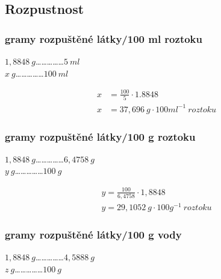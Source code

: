 \documentclass[13pt, a4paper, twoside]{article}
\begin{document}
\subsection*{Rozpustnost}
\subsubsection*{gramy rozpuštěné látky/100 ml roztoku}
\begin{center}
$1,8848 \:g$……………$5 \: ml$\\
$x\: g$……………$100 \: ml$
\end{center}

\begin{align*}
    x &= \frac{100}{5} \cdot 1.8848\\
    x &= 37,696 \: g\cdot 100ml^{-1}\: roztoku
\end{align*}

\subsubsection*{gramy rozpuštěné látky/100 g roztoku}
\begin{center}
$1,8848 \:g$……………$6,4758 \:g$\\
$y \:g$……………$100 \:g$
\end{center}

\begin{align*}
    y = \frac{100}{6,4758} \cdot 1,8848\\
    y = 29,1052\: g\cdot 100g^{-1} \: roztoku
\end{align*}

\subsubsection*{gramy rozpuštěné látky/100 g vody}
\begin{center}
$1,8848\: g$……………$4,5888\: g$\\
$z\: g$……………$100\: g$
\end{center}
\end{document}
